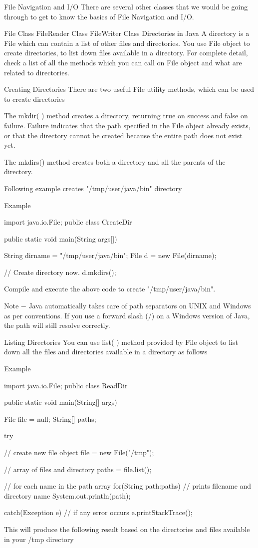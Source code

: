 File Navigation and I/O
There are several other classes that we would be going through to get to know the basics of File Navigation and I/O.

File Class
FileReader Class
FileWriter Class
Directories in Java
A directory is a File which can contain a list of other files and directories. You use File object to create directories, to list down files available in a directory. For complete detail, check a list of all the methods which you can call on File object and what are related to directories.

Creating Directories
There are two useful File utility methods, which can be used to create directories

The mkdir( ) method creates a directory, returning true on success and false on failure. Failure indicates that the path specified in the File object already exists, or that the directory cannot be created because the entire path does not exist yet.

The mkdirs() method creates both a directory and all the parents of the directory.

Following example creates "/tmp/user/java/bin" directory

Example

import java.io.File;
public class CreateDir {

   public static void main(String args[]) {
      String dirname = "/tmp/user/java/bin";
      File d = new File(dirname);

      // Create directory now.
      d.mkdirs();
   }
}
Compile and execute the above code to create "/tmp/user/java/bin".

Note − Java automatically takes care of path separators on UNIX and Windows as per conventions. If you use a forward slash (/) on a Windows version of Java, the path will still resolve correctly.

Listing Directories
You can use list( ) method provided by File object to list down all the files and directories available in a directory as follows

Example

import java.io.File;
public class ReadDir {

   public static void main(String[] args) {
      File file = null;
      String[] paths;

      try {
         // create new file object
         file = new File("/tmp");

         // array of files and directory
         paths = file.list();

         // for each name in the path array
         for(String path:paths) {
            // prints filename and directory name
            System.out.println(path);
         }
      }catch(Exception e) {
         // if any error occurs
         e.printStackTrace();
      }
   }
}
This will produce the following result based on the directories and files available in your /tmp directory

